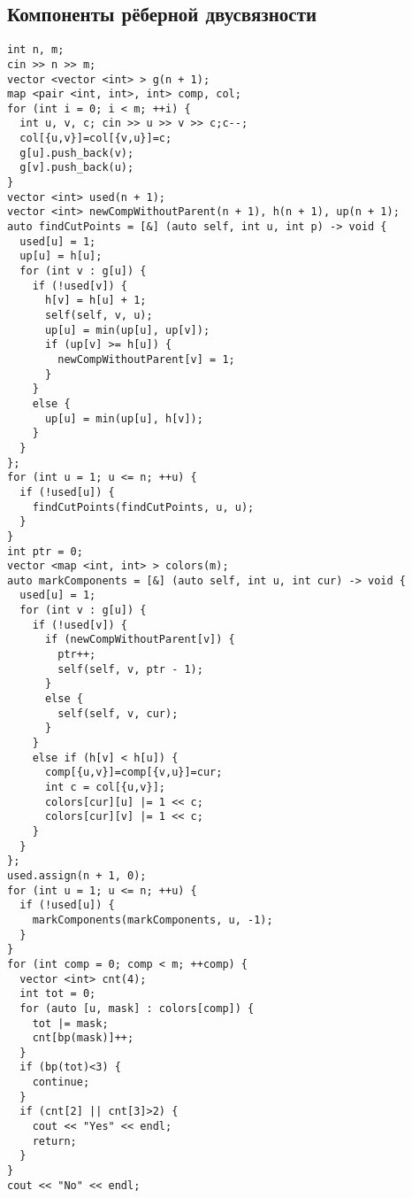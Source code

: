 \subsection{Компоненты рёберной двусвязности}
\begin{lstlisting}
int n, m;
cin >> n >> m;
vector <vector <int> > g(n + 1);
map <pair <int, int>, int> comp, col;
for (int i = 0; i < m; ++i) {
  int u, v, c; cin >> u >> v >> c;c--;
  col[{u,v}]=col[{v,u}]=c;
  g[u].push_back(v);
  g[v].push_back(u);
}
vector <int> used(n + 1);
vector <int> newCompWithoutParent(n + 1), h(n + 1), up(n + 1);
auto findCutPoints = [&] (auto self, int u, int p) -> void {
  used[u] = 1;
  up[u] = h[u];
  for (int v : g[u]) {
    if (!used[v]) {
      h[v] = h[u] + 1;
      self(self, v, u);
      up[u] = min(up[u], up[v]);
      if (up[v] >= h[u]) {
        newCompWithoutParent[v] = 1;
      }
    }
    else {
      up[u] = min(up[u], h[v]);
    }
  }
};
for (int u = 1; u <= n; ++u) {
  if (!used[u]) {
    findCutPoints(findCutPoints, u, u);
  }
}
int ptr = 0;
vector <map <int, int> > colors(m);
auto markComponents = [&] (auto self, int u, int cur) -> void {
  used[u] = 1;
  for (int v : g[u]) {
    if (!used[v]) {
      if (newCompWithoutParent[v]) {
        ptr++;
        self(self, v, ptr - 1);
      }
      else {
        self(self, v, cur);
      }
    }
    else if (h[v] < h[u]) {
      comp[{u,v}]=comp[{v,u}]=cur;
      int c = col[{u,v}];
      colors[cur][u] |= 1 << c;
      colors[cur][v] |= 1 << c;
    }
  }
};
used.assign(n + 1, 0);
for (int u = 1; u <= n; ++u) {
  if (!used[u]) {
    markComponents(markComponents, u, -1);
  }
}
for (int comp = 0; comp < m; ++comp) {
  vector <int> cnt(4);
  int tot = 0;
  for (auto [u, mask] : colors[comp]) {
    tot |= mask;
    cnt[bp(mask)]++;
  }
  if (bp(tot)<3) {
    continue;
  }
  if (cnt[2] || cnt[3]>2) {
    cout << "Yes" << endl;
    return;
  }
}
cout << "No" << endl;
\end{lstlisting}

